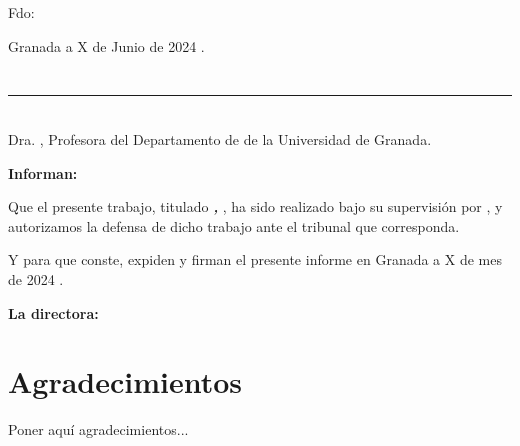 \vspace{6cm}

\noindent Fdo: \myName

\vspace{2cm}

\begin{flushright}
Granada a X de Junio de 2024 .
\end{flushright}


\chapter*{}
\thispagestyle{empty}

\noindent\rule[-1ex]{\textwidth}{2pt}\\[4.5ex]

Dra. \textbf{\myProf}, Profesora del Departamento de \myDepartment de la Universidad de Granada.


\vspace{0.5cm}

\textbf{Informan:}

\vspace{0.5cm}

Que el presente trabajo, titulado \textit{\textbf{\myTitle, \mySubTitle}},
ha sido realizado bajo su supervisión por \textbf{\myName}, y autorizamos la defensa de dicho trabajo ante el tribunal que corresponda.

\vspace{0.5cm}

Y para que conste, expiden y firman el presente informe en Granada a X de mes de 2024 .

\vspace{1cm}

\textbf{La directora:}

\vspace{5cm}

\noindent \textbf{}

\chapter*{Agradecimientos}
\thispagestyle{empty}
\vspace{1cm}


Poner aquí agradecimientos...